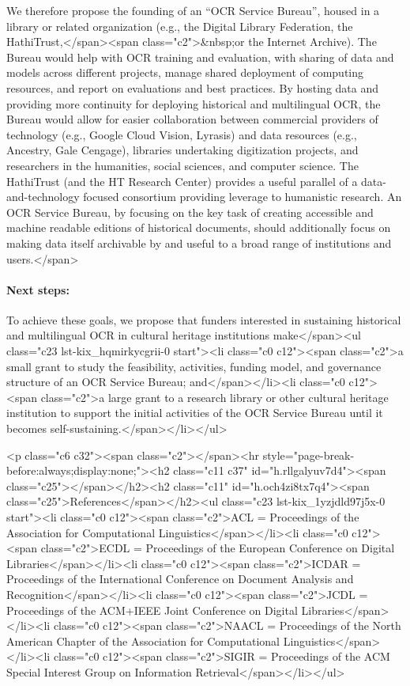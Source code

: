 \documentclass[twoside,11pt]{report}
\begin{document}
We therefore propose the founding of an ``OCR Service Bureau'', housed in a library or related organization (e.g., the Digital Library Federation, the HathiTrust,</span><span class="c2">&nbsp;or the Internet Archive). The Bureau would help with OCR training and evaluation, with sharing of data and models across different projects, manage shared deployment of computing resources, and report on evaluations and best practices. By hosting data and providing more continuity for deploying historical and multilingual OCR, the Bureau would allow for easier collaboration between commercial providers of technology (e.g., Google Cloud Vision, Lyrasis) and data resources (e.g., Ancestry, Gale Cengage), libraries undertaking digitization projects, and researchers in the humanities, social sciences, and computer science. The HathiTrust (and the HT Research Center) provides a useful parallel of a data-and-technology focused consortium providing leverage to humanistic research. An OCR Service Bureau, by focusing on the key task of creating accessible and machine readable editions of historical documents, should additionally focus on making data itself archivable by and useful to a broad range of institutions and users.</span>

\paragraph{Next steps:} To achieve these goals, we propose that funders interested in sustaining historical and multilingual OCR in cultural heritage institutions make</span><ul class="c23 lst-kix_hqmirkycgrii-0 start"><li class="c0 c12"><span class="c2">a small grant to study the feasibility, activities, funding model, and governance structure of an OCR Service Bureau; and</span></li><li class="c0 c12"><span class="c2">a large grant to a research library or other cultural heritage institution to support the initial activities of the OCR Service Bureau until it becomes self-sustaining.</span></li></ul>

<p class="c6 c32"><span class="c2"></span><hr style="page-break-before:always;display:none;"><h2 class="c11 c37" id="h.rllgalyuv7d4"><span class="c25"></span></h2><h2 class="c11" id="h.och4zi8tx7q4"><span class="c25">References</span></h2><ul class="c23 lst-kix_1yzjdld97j5x-0 start"><li class="c0 c12"><span class="c2">ACL = Proceedings of the Association for Computational Linguistics</span></li><li class="c0 c12"><span class="c2">ECDL = Proceedings of the European Conference on Digital Libraries</span></li><li class="c0 c12"><span class="c2">ICDAR = Proceedings of the International Conference on Document Analysis and Recognition</span></li><li class="c0 c12"><span class="c2">JCDL = Proceedings of the ACM+IEEE Joint Conference on Digital Libraries</span></li><li class="c0 c12"><span class="c2">NAACL = Proceedings of the North American Chapter of the Association for Computational Linguistics</span></li><li class="c0 c12"><span class="c2">SIGIR = Proceedings of the ACM Special Interest Group on Information Retrieval</span></li></ul>
\end{document}
